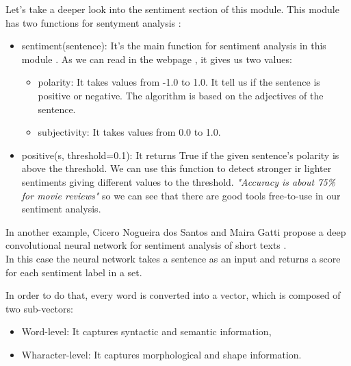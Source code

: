 \documentclass[12pt,twoside]{article}
\theoremstyle{plain}
\theoremstyle{definition}
\theoremstyle{remark}
\begin{document}
		Let's take a deeper look into the sentiment section of this module. This module has two functions for sentyment analysis \cite{python_module_sentiment}:
		
		\begin{itemize}
			\item sentiment(sentence): It's the main function for sentiment analysis in this module . As we can read in the webpage \cite{python_module_sentiment}, it gives us two values:
			
			\begin{itemize}
				\item polarity: It takes values from -1.0 to 1.0. It tell us if the sentence is positive or negative. The algorithm is based on the adjectives of the sentence.
				\item subjectivity: It takes values from 0.0 to 1.0.
			\end{itemize}
			
			\item positive(s, threshold=0.1): It returns True if the given sentence's polarity is above the threshold. We can use this function to detect stronger ir lighter sentiments giving different values to the threshold. \textit{"Accuracy is about 75\% for movie reviews" }\cite{python_module_sentiment} so we can see that there are good tools free-to-use in our sentiment analysis. 
		\end{itemize}
		
		In another example, Cicero Nogueira dos Santos and Maira Gatti propose a deep convolutional neural network for sentiment analysis of short texts \cite{glorot2011domain}.\\
		
		In this case the neural network takes a sentence as an input and returns a score for each sentiment label in a set. 
		
		In order to do that, every word is converted into a vector, which is composed of two sub-vectors:
		
		\begin{itemize}
			\item Word-level: It captures syntactic and semantic information,
			\item Wharacter-level: It captures morphological and shape information.

		\end{itemize}
		
	 
		
		
		
	
		
\end{document}
